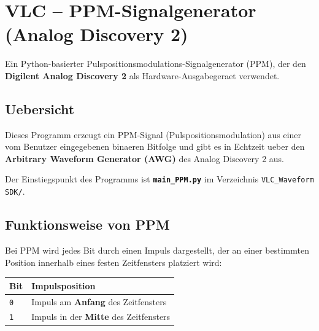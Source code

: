 %

\section*{VLC -- PPM-Signalgenerator (Analog Discovery 2)}

Ein Python-basierter Pulspositionsmodulations-Signalgenerator (PPM),
der den \textbf{Digilent Analog Discovery 2} als Hardware-Ausgabegeraet verwendet.

\subsection*{Uebersicht}

Dieses Programm erzeugt ein PPM-Signal (Pulspositionsmodulation) aus einer
vom Benutzer eingegebenen binaeren Bitfolge und gibt es in Echtzeit ueber den
\textbf{Arbitrary Waveform Generator (AWG)} des Analog Discovery 2 aus.

Der Einstiegspunkt des Programms ist \textbf{\texttt{main\_PPM.py}} im
Verzeichnis \texttt{VLC\_Waveform SDK/}.

\subsection*{Funktionsweise von PPM}

Bei PPM wird jedes Bit durch einen Impuls dargestellt, der an einer bestimmten
Position innerhalb eines festen Zeitfensters platziert wird:

\begin{center}
\begin{tabular}{ll}
\toprule
\textbf{Bit} & \textbf{Impulsposition} \\
\midrule
\texttt{0} & Impuls am \textbf{Anfang} des Zeitfensters \\
\texttt{1} & Impuls in der \textbf{Mitte} des Zeitfensters \\
\bottomrule
\end{tabular}
\end{center}

